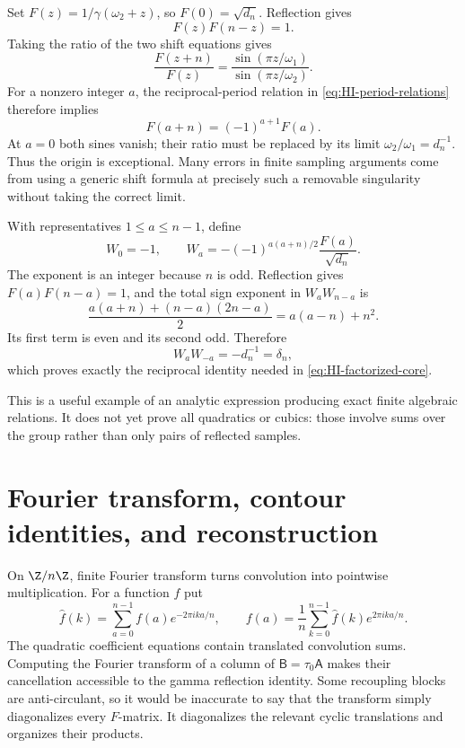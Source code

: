 Set $F(z)=1/\gamma(\omega_2+z)$, so $F(0)=\sqrt{d_n}$.
Reflection gives
\begin{equation}
 F(z)F(n-z)=1.
 \label{eq:HI-sample-reflection}
\end{equation}
Taking the ratio of the two shift equations gives
\[
 \frac{F(z+n)}{F(z)}
 =\frac{\sin(\pi z/\omega_1)}{\sin(\pi z/\omega_2)}.
\]
For a nonzero integer $a$, the reciprocal-period relation in
\eqref{eq:HI-period-relations} therefore implies
\begin{equation}
 F(a+n)=(-1)^{a+1}F(a).
 \label{eq:HI-sample-shift}
\end{equation}
At $a=0$ both sines vanish; their ratio must be replaced by its
limit $\omega_2/\omega_1=d_n^{-1}$.  Thus the origin is
exceptional.  Many errors in finite sampling arguments come from
using a generic shift formula at precisely such a removable
singularity without taking the correct limit.

With representatives $1\leq a\leq n-1$, define
\begin{equation}
 W_0=-1,\qquad
 W_a=-(-1)^{a(a+n)/2}\frac{F(a)}{\sqrt{d_n}}.
 \label{eq:HI-W-samples}
\end{equation}
The exponent is an integer because $n$ is odd.  Reflection gives
$F(a)F(n-a)=1$, and the total sign exponent in $W_aW_{n-a}$ is
\[
 \frac{a(a+n)+(n-a)(2n-a)}2=a(a-n)+n^2.
\]
Its first term is even and its second odd.  Therefore
\begin{equation}
 W_aW_{-a}=-d_n^{-1}=\delta_n,
\end{equation}
which proves exactly the reciprocal identity needed in
\eqref{eq:HI-factorized-core}.

This is a useful example of an analytic expression producing exact
finite algebraic relations.  It does not yet prove all quadratics
or cubics: those involve sums over the group rather than only pairs
of reflected samples.

\section{Fourier transform, contour identities, and reconstruction}

On $\Z/n\Z$, finite Fourier transform turns convolution into
pointwise multiplication.  For a function $f$ put
\[
 \widehat f(k)=\sum_{a=0}^{n-1}f(a)e^{-2\pi i ka/n},
 \qquad
 f(a)=\frac1n\sum_{k=0}^{n-1}\widehat f(k)e^{2\pi i ka/n}.
\]
The quadratic coefficient equations contain translated convolution
sums.  Computing the Fourier transform of a column of
$\mathsf B=\tau_0\mathsf A$ makes their cancellation accessible to the gamma
reflection identity.  Some recoupling blocks are anti-circulant,
so it would be inaccurate to say that the transform simply
diagonalizes every $F$-matrix.  It diagonalizes the relevant cyclic
translations and organizes their products.

